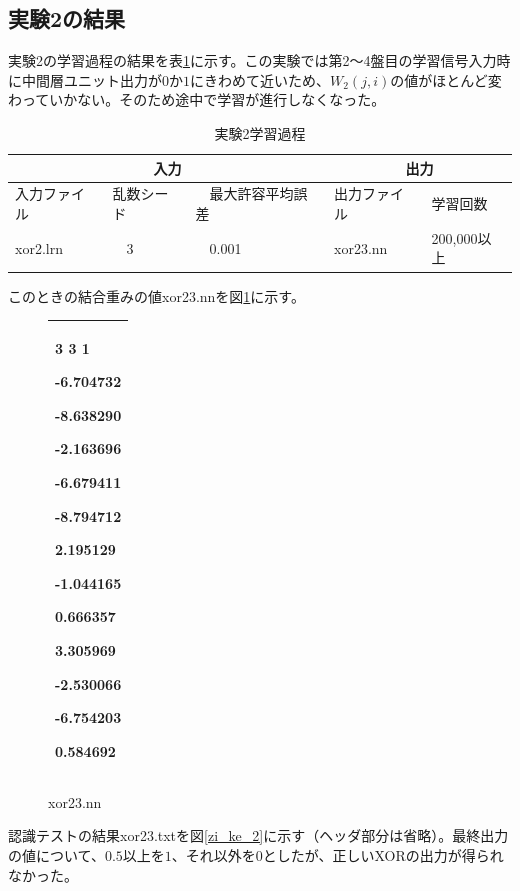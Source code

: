 \documentclass[final]{jarticle}[2012/05/15]
\begin{document}
\subsection{実験2の結果}
実験2の学習過程の結果を表\ref{zi_ga_2}に示す。この実験では第2～4盤目の学習信号入力時に中間層ユニット出力が$0$か$1$にきわめて近いため、$W_2(j,i)$の値がほとんど変わっていかない。そのため途中で学習が進行しなくなった。\par
\begin{table}[h]
  \begin{center}
    \caption{実験2学習過程} \label{zi_ga_2}
    \begin{tabular}{|l|l|l|l|l|}\hline
      \multicolumn{3}{|c|}{入力} & \multicolumn{2}{|c|}{出力} \\ \hline
      入力ファイル & 乱数シード &　最大許容平均誤差 & 出力ファイル & 学習回数 \\ \hline
      xor2.lrn &　3 &　0.001 & xor23.nn & 200,000以上 \\ \hline
    \end{tabular}
  \end{center}
\end{table}
このときの結合重みの値xor23.nnを図\ref{zi_nn_2}に示す。\par
\begin{figure}[h]
  \begin{center}
    \begin{tabular}{|p{8cm}|}\hline
      3 3 1\par
      -6.704732\par
      -8.638290\par
      -2.163696\par
      -6.679411\par
      -8.794712\par
      2.195129\par
      -1.044165\par
      0.666357\par
      3.305969\par
      -2.530066\par
      -6.754203\par
      0.584692 \\ \hline
    \end{tabular}
    \caption{xor23.nn} \label{zi_nn_2}
  \end{center}
\end{figure}
認識テストの結果xor23.txtを図\ref{zi_ke_2}に示す（ヘッダ部分は省略）。最終出力の値について、$0.5$以上を$1$、それ以外を$0$としたが、正しいXORの出力が得られなかった。\par
\end{document}
